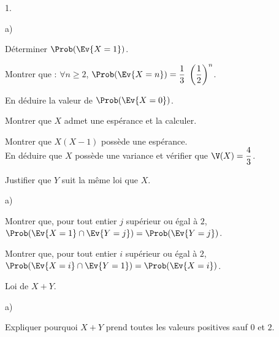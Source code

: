 \documentclass[11pt]{article}%
\begin{document}
\begin{noliste}{1.}
  \setlength{\itemsep}{4mm}
\item
  \begin{noliste}{a)}
    \setlength{\itemsep}{2mm}
  \item Déterminer $\Prob(\Ev{X = 1})$.

    
    



  \item Montrer que : $\forall n \geq 2$, $\Prob(\Ev{X = n}) =
    \dfrac{1}{3} \ \left( \dfrac{1}{2} \right)^n$.

    



    
  \item En déduire la valeur de $\Prob(\Ev{X = 0})$.

    
  \end{noliste}

\item Montrer que $X$ admet une espérance et la calculer.

  

\item Montrer que $X (X-1)$ possède une espérance. \\
  En déduire que $X$ possède une variance et vérifier que $\V(X) =
  \dfrac{4}{3}$.

  

\item Justifier que $Y$ suit la même loi que $X$.

  

\item
  \begin{noliste}{a)}
    \setlength{\itemsep}{2mm}
  \item Montrer que, pour tout entier $j$ supérieur ou égal à $2$,
    $\Prob(\Ev{X = 1} \cap \Ev{Y = j}) = \Prob(\Ev{Y = j})$.

    

  \item Montrer que, pour tout entier $i$ supérieur ou égal à $2$,
    $\Prob(\Ev{X = i} \cap \Ev{Y = 1}) = \Prob(\Ev{X = i})$.

    
  \end{noliste}

\item Loi de $X + Y$.
  \begin{noliste}{a)}
    \setlength{\itemsep}{2mm}
  \item Expliquer pourquoi $X + Y$ prend toutes les valeurs positives
    sauf $0$ et $2$.


\end{noliste}
\end{noliste}
\end{document}
